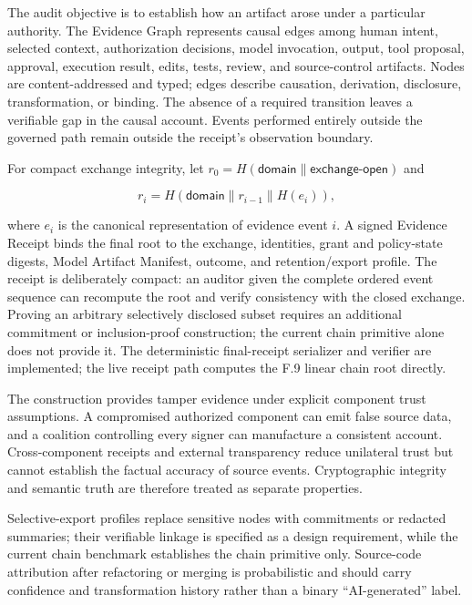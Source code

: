 \documentclass[10pt]{article}
\begin{document}
The audit objective is to establish how an artifact arose under a particular authority. The Evidence Graph represents causal edges among human intent, selected context, authorization decisions, model invocation, output, tool proposal, approval, execution result, edits, tests, review, and source-control artifacts. Nodes are content-addressed and typed; edges describe causation, derivation, disclosure, transformation, or binding. The absence of a required transition leaves a verifiable gap in the causal account. Events performed entirely outside the governed path remain outside the receipt's observation boundary.

For compact exchange integrity, let $r_0=H(\textsf{domain}\parallel\textsf{exchange-open})$ and

\begin{equation}
r_i = H(\textsf{domain}\parallel r_{i-1}\parallel H(e_i)),
\end{equation}

where $e_i$ is the canonical representation of evidence event $i$. A signed Evidence Receipt binds the final root to the exchange, identities, grant and policy-state digests, Model Artifact Manifest, outcome, and retention/export profile. The receipt is deliberately compact: an auditor given the complete ordered event sequence can recompute the root and verify consistency with the closed exchange. Proving an arbitrary selectively disclosed subset requires an additional commitment or inclusion-proof construction; the current chain primitive alone does not provide it. The deterministic final-receipt serializer and verifier are implemented; the live receipt path computes the F.9 linear chain root directly.

The construction provides tamper evidence under explicit component trust assumptions. A compromised authorized component can emit false source data, and a coalition controlling every signer can manufacture a consistent account. Cross-component receipts and external transparency reduce unilateral trust but cannot establish the factual accuracy of source events. Cryptographic integrity and semantic truth are therefore treated as separate properties.

Selective-export profiles replace sensitive nodes with commitments or redacted summaries; their verifiable linkage is specified as a design requirement, while the current chain benchmark establishes the chain primitive only. Source-code attribution after refactoring or merging is probabilistic and should carry confidence and transformation history rather than a binary ``AI-generated'' label.
\end{document}

